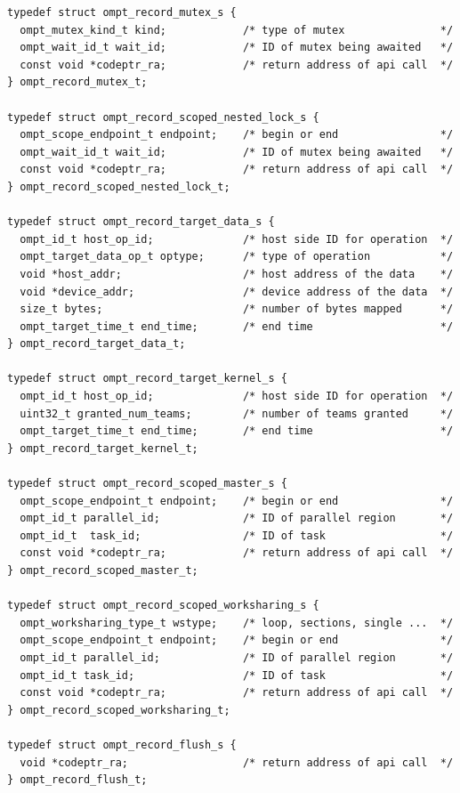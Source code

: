 \documentclass{article}
\begin{document}
\begin{verbatim}
typedef struct ompt_record_mutex_s {
  ompt_mutex_kind_t kind;            /* type of mutex               */
  ompt_wait_id_t wait_id;            /* ID of mutex being awaited   */
  const void *codeptr_ra;            /* return address of api call  */       
} ompt_record_mutex_t;

typedef struct ompt_record_scoped_nested_lock_s {
  ompt_scope_endpoint_t endpoint;    /* begin or end                */
  ompt_wait_id_t wait_id;            /* ID of mutex being awaited   */
  const void *codeptr_ra;            /* return address of api call  */       
} ompt_record_scoped_nested_lock_t;

typedef struct ompt_record_target_data_s {
  ompt_id_t host_op_id;              /* host side ID for operation  */
  ompt_target_data_op_t optype;      /* type of operation           */
  void *host_addr;                   /* host address of the data    */
  void *device_addr;                 /* device address of the data  */ 
  size_t bytes;                      /* number of bytes mapped      */
  ompt_target_time_t end_time;       /* end time                    */
} ompt_record_target_data_t;

typedef struct ompt_record_target_kernel_s {
  ompt_id_t host_op_id;              /* host side ID for operation  */
  uint32_t granted_num_teams;        /* number of teams granted     */
  ompt_target_time_t end_time;       /* end time                    */
} ompt_record_target_kernel_t;

typedef struct ompt_record_scoped_master_s {
  ompt_scope_endpoint_t endpoint;    /* begin or end                */
  ompt_id_t parallel_id;             /* ID of parallel region       */
  ompt_id_t  task_id;                /* ID of task                  */
  const void *codeptr_ra;            /* return address of api call  */
} ompt_record_scoped_master_t;

typedef struct ompt_record_scoped_worksharing_s {
  ompt_worksharing_type_t wstype;    /* loop, sections, single ...  */
  ompt_scope_endpoint_t endpoint;    /* begin or end                */
  ompt_id_t parallel_id;             /* ID of parallel region       */
  ompt_id_t task_id;                 /* ID of task                  */
  const void *codeptr_ra;            /* return address of api call  */
} ompt_record_scoped_worksharing_t;

typedef struct ompt_record_flush_s {
  void *codeptr_ra;                  /* return address of api call  */
} ompt_record_flush_t;


\end{verbatim}
\end{document}
